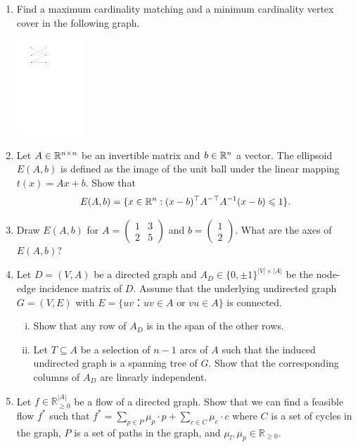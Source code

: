 \documentclass[11pt]{article}
\institute{\'Ecole Polytechnique F\'ed\'erale de Lausanne}
\renewcommand{\leq}{\leqslant}
\renewcommand{\geq}{\geqslant}
\begin{document}
\makeheader

\begin{enumerate}[1)]
\item Find a maximum cardinality matching and a minimum cardinality vertex cover in the following graph.
  \begin{center}
    \includegraphics[width=0.2\textwidth]{../graph1}
  \end{center}
\item 
Let $A \in \mathbb{R}^{n \times n}$ be an invertible matrix and $b \in \mathbb{R}^{n}$ a vector. The ellipsoid $E(A,b)$ is defined as the image of the unit ball under the linear mapping $t(x) = Ax+b$. Show that
$$E(A,b) = \{ x \in \R^n: (x-b)^\top A^{-\top} A^{-1} (x-b) \leq 1 \}.$$
	
\item 
Draw $E(A,b)$ for $A = \begin{pmatrix} 1 & 3  \\ 2 & 5 \end{pmatrix}$ and $b  = \begin{pmatrix} 1   \\ 2 \end{pmatrix}$. What are the axes of $E(A,b)$?

\item Let $D = (V,A)$  be a directed graph and $A_D ∈ \{0,\pm1\}^{|V| × |A|}$ be the node-edge incidence matrix of $D$. Assume that the underlying undirected graph $G = (V,E)$  with $E = \{ uv ： uv ∈A \text{ or } vu ∈ A\}$ is connected. 
  \begin{enumerate}[i)]
  \item Show that any row of $A_D$ is in the span of the other rows.
  \item Let $T ⊆ A$ be a selection of $n-1$ arcs of $A$ such that the induced undirected graph is a spanning tree of $G$. Show that the corresponding columns of $A_D$ are linearly independent.
  \end{enumerate}
  
  
  
\item Let $f \in \mathbb{R}^{|A|}_{\geq 0}$ be a flow of a directed graph. Show that we can find a feasible flow $f^*$ such that $f^* = \sum_{p \in P}  \mu_p \cdot p + \sum_{c \in C}\mu_c \cdot c$ where $C$ is a set of cycles in the graph, $P$ is a set of paths in the graph, and $\mu_l, \mu_p \in \mathbb{R}_{\geq 0}$.


\end{enumerate}
\end{document}
